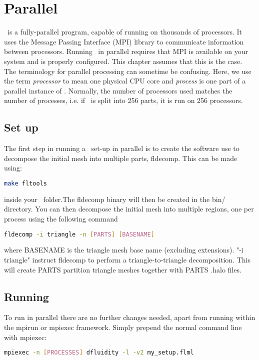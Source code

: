 \chapter{Parallel}

\fluidity\ is a fully-parallel program, capable of running on thousands of processors. 
It uses the Message Passing Interface (MPI) library to communicate information between 
processors. Running \fluidity\ in parallel requires that MPI is available on your system
and is properly configured. This chapter assumes that this is the case. The 
terminology for parallel processing can sometime be confusing. Here, we use the 
term \emph{processor} to mean one physical CPU core and \emph{process} is one part
of a parallel instance of \fluidity. Normally, the number of processors used matches
the number of processes, i.e. if \fluidity\ is split into 256 parts, it is run on 256 processors.

\section{Set up}

The first step in running a \fluidity\ set-up in parallel is to create the software
use to decompose the initial mesh into multiple parts, fldecomp. This can be made using:
\begin{lstlisting}[language=bash]
make fltools
\end{lstlisting}
inside your \fluidity\ folder.The fldecomp binary will then be created in the bin/ directory. 
You can then decompose the initial mesh into multiple regions, one per process using the following command
\begin{lstlisting}[language=bash]
fldecomp -i triangle -n [PARTS] [BASENAME]
\end{lstlisting}
where BASENAME is the triangle mesh base name (excluding extensions). "-i triangle"
instruct fldecomp to perform a triangle-to-triangle decomposition. 
This will create PARTS partition triangle meshes together with PARTS .halo files. 

\section{Running}

To run in parallel there are no further changes needed, apart from running \fluidity
within the mpirun or mpiexec framework. Simply prepend the normal command line with mpiexec:
\begin{lstlisting}[language=bash]
mpiexec -n [PROCESSES] dfluidity -l -v2 my_setup.flml
\end{lstlisting}

